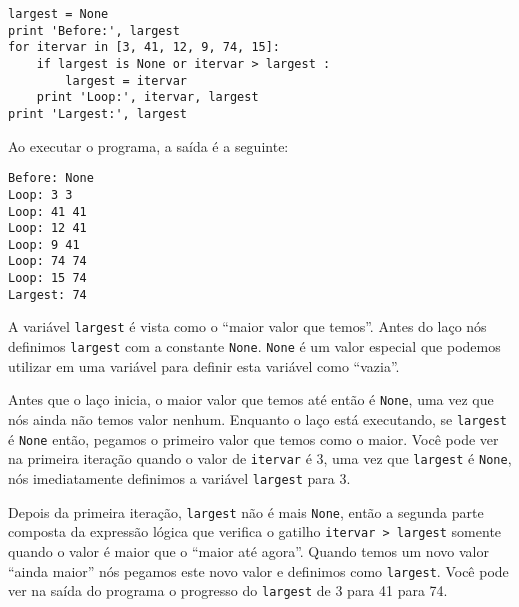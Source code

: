 \beforeverb
\begin{verbatim}
largest = None
print 'Before:', largest
for itervar in [3, 41, 12, 9, 74, 15]:
    if largest is None or itervar > largest :
        largest = itervar
    print 'Loop:', itervar, largest
print 'Largest:', largest
\end{verbatim}
\afterverb
%
%
Ao executar o programa, a saída é a seguinte:
\beforeverb
\begin{verbatim}
Before: None
Loop: 3 3
Loop: 41 41
Loop: 12 41
Loop: 9 41
Loop: 74 74
Loop: 15 74
Largest: 74
\end{verbatim}
\afterverb
%
%
A variável {\tt largest} é vista como o ``maior valor que temos''. Antes do
laço nós definimos {\tt largest} com a constante {\tt None}. {\tt None} é um
valor especial que podemos utilizar em uma variável para definir esta
variável como ``vazia''.


Antes que o laço inicia, o maior valor que temos até então é {\tt None}, uma
vez que nós ainda não temos valor nenhum. Enquanto o laço está executando, se
{\tt largest} é {\tt None} então, pegamos o primeiro valor que temos como
o maior. Você pode ver na primeira iteração quando o valor de {\tt itervar} é
3, uma vez que {\tt largest} é {\tt None}, nós imediatamente definimos a
variável {\tt largest} para 3.


Depois da primeira iteração, {\tt largest} não é mais {\tt None}, então a
segunda parte composta da expressão lógica que verifica o gatilho
{\tt itervar > largest} somente quando o valor é maior que o ``maior até agora''.
Quando temos um novo valor ``ainda maior'' nós pegamos este novo valor e
definimos como {\tt largest}. Você pode ver na saída do programa o
progresso do {\tt largest} de 3 para 41 para 74.

